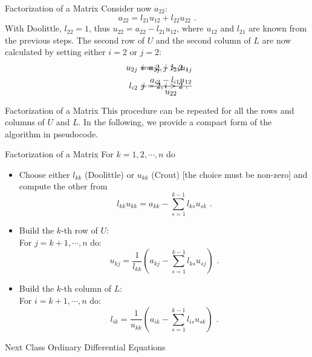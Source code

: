 \documentclass[11pt]{beamer}
\begin{document}
\begin{frame}[fragile]{Factorization of a Matrix}
Consider now $a_{22}$:
\begin{equation}
a_{22} = l_{21} u_{12} + l_{22} u_22\,\,.
\end{equation}
With Doolittle, $l_{22} = 1$, thus $u_{22} = a_{22} - l_{21} u_{12}$,
where $u_{12}$ and $l_{21}$ are known from the previous steps. The
second row of $U$ and the second column of $L$ are now calculated
by setting either $i=2$ or $j=2$:
\begin{align}
u_{2j} &= a_{2j} -l_{21} u_{1j}&\hspace{-2.5cm}i=2, j > 2\,\,,\nonumber\\
l_{i2} &= \frac{a_{i2} - l_{i1}u_{12}}{u_{22}} &\hspace{-2.5cm} j=2, i>2\,\,.
\end{align}
\end{frame}

\begin{frame}[fragile]{Factorization of a Matrix}
This procedure can be repeated for all the rows and columns of $U$ and $L$.
In the following, we provide a compact form of the algorithm in
pseudocode.
\end{frame}

\begin{frame}[fragile]{Factorization of a Matrix}
For $k=1, 2, \cdots, n$ do
\small
\begin{itemize}
  \item Choose either $l_{kk}$ (Doolittle) or $u_{kk}$ (Crout) [the choice
    must be non-zero] and compute the other from
    \begin{equation}
      l_{kk} u_{kk} = a_{kk} - \sum_{s=1}^{k-1} l_{ks} u_{sk}\,\,.
    \end{equation}

  \item Build the $k$-th row of $U$:\\
    For $j=k+1,\cdots,n$ do:
    \begin{equation}
      u_{kj} = \frac{1}{l_{kk}} \left(a_{kj} - \sum_{s=1}^{k-1} l_{ks} u_{sj} \right)\,\,.
    \end{equation}

  \item Build the $k$-th column of $L$:\\
    For $i=k+1,\cdots,n$ do:
    \begin{equation}
      l_{ik} = \frac{1}{u_{kk}} \left(a_{ik} - \sum_{s=1}^{k-1} l_{is} u_{sk} \right)\,\,.
    \end{equation}

\end{itemize}
\end{frame}

\begin{frame}[fragile]{Next Class}
Ordinary Differential Equations
\end{frame}
\end{document}
